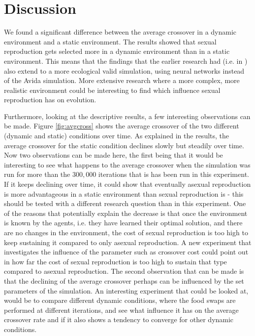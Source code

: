 \section{Discussion}

We found a significant difference between the average crossover in a dynamic environment and a static environment.
The results showed that sexual reproduction gets selected more in a dynamic environment than in a static environment.
This means that the findings that the earlier research had (i.e. in \cite{misevicchanging}) also extend to a more ecological valid simulation, using neural networks instead of the Avida simulation.
More extensive research where a more complex, more realistic environment could be interesting to find which influence sexual reproduction has on evolution.

Furthermore, looking at the descriptive results, a few interesting observations can be made.
Figure \ref{fig:avgcross} shows the average crossover of the two different (dynamic and static) conditions over time.
As explained in the results, the average crossover for the static condition declines slowly but steadily over time.
Now two observations can be made here, the first being that it would be interesting to see what happens to the average crossover when the simulation was run for more than the $300,000$ iterations that is has been run in this experiment.
If it keeps declining over time, it could show that eventually asexual reproduction is more advantageous in a static environment than sexual reproduction is - this should be tested with a different research question than in this experiment.
One of the reasons that potentially explain the decrease is that once the environment is known by the agents, i.e. they have learned their optimal solution, and there are no changes in the environment, the cost of sexual reproduction is too high to keep sustaining it compared to only asexual reproduction.
A new experiment that investigates the influence of the parameter such as crossover cost could point out in how far the cost of sexual reproduction is too high to sustain that type compared to asexual reproduction.
The second observation that can be made is that the declining of the average crossover perhaps can be influenced by the set parameters of the simulation.
An interesting experiment that could be looked at, would be to compare different dynamic conditions, where the food swaps are performed at different iterations, and see what influence it has on the average crossover rate and if it also shows a tendency to converge for other dynamic conditions.

